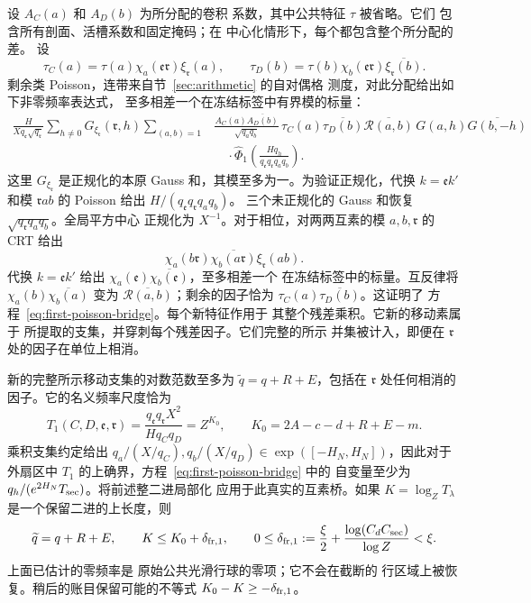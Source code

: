 设 \(A_C(a)\) 和 \(A_D(b)\) 为所分配的卷积
系数，其中公共特征 \(\tau\) 被省略。它们
包含所有剖面、活槽系数和固定掩码；在
中心化情形下，每个都包含整个所分配的差。
设
\[
 \tau_C(a)=\tau(a)\chi_a(\mathfrak e\mathfrak r)
                       \xi_{\mathfrak r}(a),\qquad
 \tau_D(b)=\tau(b)\chi_b(\mathfrak e\mathfrak r)
                       \overline{\xi_{\mathfrak r}(b)}.
\]
剩余类 Poisson，连带来自节~\ref{sec:arithmetic} 的自对偶格
测度，对此分配给出如下非零频率表达式，
至多相差一个在冻结标签中有界模的标量：
\begin{equation}
 \begin{split}
 \frac{H}{Xq_{\mathfrak e}\sqrt{q_{\mathfrak r}}}
 \sum_{h\ne0}G_{\xi_{\mathfrak r}}(\mathfrak r,h)
 \sum_{(a,b)=1}
 &\frac{A_C(a)\overline{A_D(b)}}{\sqrt{q_aq_b}}\,
 \tau_C(a)\overline{\tau_D(b)}
 \overline{\mathcal R(a,b)}\,
 G(a,h)\overline{G(b,-h)}
 \\
 &\quad\cdot
 \widehat\Phi_1\left(
    \frac{Hq_h}{q_{\mathfrak e}q_{\mathfrak r}q_aq_b}
                    \right).
 \end{split}
 \label{eq:first-poisson-bridge}
\end{equation}
这里 \(G_{\xi_{\mathfrak r}}\) 是正规化的本原 Gauss
和，其模至多为一。为验证正规化，代换
\(k=\mathfrak e k'\) 和模
\(\mathfrak r ab\) 的 Poisson 给出 \(H/(q_{\mathfrak e}q_{\mathfrak r}q_aq_b)\)。
三个未正规化的 Gauss 和恢复
\(\sqrt{q_{\mathfrak r}q_aq_b}\)。全局平方中心
正规化为 \(X^{-1}\)。对于相位，对两两互素的模
\(a,b,\mathfrak r\) 的 CRT 给出
\[
 \chi_a(b\mathfrak r)\overline{\chi_b(a\mathfrak r)}
       \xi_{\mathfrak r}(ab).
\]
代换 \(k=\mathfrak e k'\) 给出
\(\chi_a(\mathfrak e)\overline{\chi_b(\mathfrak e)}\)，至多相差一个
在冻结标签中的标量。互反律将
\(\chi_a(b)\overline{\chi_b(a)}\) 变为
\(\overline{\mathcal R(a,b)}\)；剩余的因子恰为
\(\tau_C(a)\overline{\tau_D(b)}\)。这证明了
方程~\eqref{eq:first-poisson-bridge}。每个新特征作用于
其整个残差乘积。它新的移动素属于
所提取的支集，并穿刺每个残差因子。它们完整的所示
并集被计入，即便在 \(\mathfrak r\) 处的因子在单位上相消。

新的完整所示移动支集的对数范数至多为
\(\widetilde q=q+R+E\)，包括在
\(\mathfrak r\) 处任何相消的因子。它的名义频率尺度恰为
\[
 T_1(C,D,\mathfrak e,\mathfrak r)
 =\frac{q_{\mathfrak e}q_{\mathfrak r}X^2}
        {Hq_Cq_D}=Z^{K_0},
 \qquad K_0=2A-c-d+R+E-m.
\]
乘积支集约定给出
\(q_a/(X/q_C),q_b/(X/q_D)\in\exp([-H_N,H_N])\)，因此对于
外扇区中 \(T_1\) 的上确界，方程~\eqref{eq:first-poisson-bridge} 中的
自变量至少为
\(q_h/(e^{2H_N}T_{\rm sec})\)。将前述整二进局部化
应用于此真实的互素桥。如果 \(K=\log_ZT_\lambda\)
是一个保留二进的上长度，则
\begin{equation}
 \widetilde q=q+R+E,\qquad
 K\le K_0+\delta_{{\rm fr},1},\qquad
 0\le\delta_{{\rm fr},1}:=\frac\xi2+
       \frac{\log(C_dC_{\rm sec})}{\log Z}<\xi.
 \label{old-eq:2.3}
\end{equation}
上面已估计的零频率是
原始公共光滑行球的零项；它不会在截断的
行区域上被恢复。稍后的账目保留可能的不等式
\(K_0-K\ge-\delta_{{\rm fr},1}\)。

